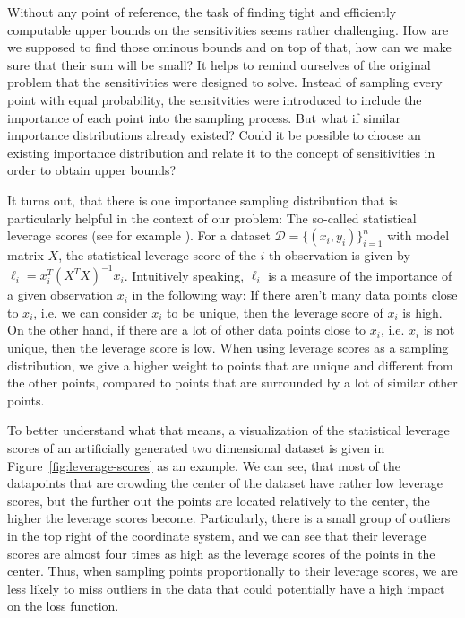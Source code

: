 Without any point of reference, the task of finding tight
and efficiently computable upper bounds
on the sensitivities seems rather challenging.
How are we supposed to find those ominous bounds and on top of that,
how can we make sure that their sum will be small?
It helps to remind ourselves of the original problem that the sensitivities
were designed to solve. Instead of sampling every point with equal
probability, the sensitvities were introduced to include the importance
of each point into the sampling process.
But what if similar importance distributions already existed?
Could it be possible to choose an existing importance distribution
and relate it to the concept of sensitivities in order to
obtain upper bounds?

It turns out, that there is one importance sampling
distribution that is particularly helpful in the context of our problem:
The so-called statistical leverage scores (see for example
\cite{leverage-scores-drineas}).
For a dataset $\mathcal{D} = \{(x_i, y_i)\}_{i=1}^n$ with model
matrix $X$, the statistical leverage score of the $i$-th observation is
given by $\ell_i = x_i^T(X^TX)^{-1}x_i$.
Intuitively speaking, $\ell_i$ is a measure of the importance of a given
observation $x_i$ in the following way: If there aren't many
data points close to $x_i$, i.e. we can consider $x_i$ to be
unique, then the leverage score of $x_i$
is high. On the other hand, if there are a lot of other data points
close to $x_i$, i.e. $x_i$ is not unique, then the leverage score
is low. When using leverage scores as a sampling distribution, we
give a higher weight to points that are unique and different from
the other points, compared to points that are surrounded by a lot
of similar other points.

To better understand what that means, a visualization of the statistical
leverage scores of an artificially generated two dimensional dataset
is given in Figure~\ref{fig:leverage-scores} as an example.
We can see, that most of the datapoints that are crowding the
center of the dataset have rather low leverage scores, but the further
out the points are located relatively to the center, the higher
the leverage scores become.
Particularly, there is a small group of outliers in the
top right of the coordinate system, and we can see that their leverage
scores are almost four times as high as the leverage scores
of the points in the center. Thus, when sampling points proportionally
to their leverage scores, we are less likely to miss outliers in
the data that could potentially have a high impact on the loss function.

